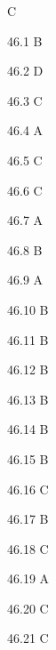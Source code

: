 \begin{Solution}{46}
C
\end{Solution}
\begin{Solution}{46.{1}}
B
\end{Solution}
\begin{Solution}{46.{2}}
D
\end{Solution}
\begin{Solution}{46.{3}}
C
\end{Solution}
\begin{Solution}{46.{4}}
A
\end{Solution}
\begin{Solution}{46.{5}}
C
\end{Solution}
\begin{Solution}{46.{6}}
C
\end{Solution}
\begin{Solution}{46.{7}}
A
\end{Solution}
\begin{Solution}{46.{8}}
B
\end{Solution}
\begin{Solution}{46.{9}}
A
\end{Solution}
\begin{Solution}{46.{10}}
B
\end{Solution}
\begin{Solution}{46.{11}}
B
\end{Solution}
\begin{Solution}{46.{12}}
B
\end{Solution}
\begin{Solution}{46.{13}}
B
\end{Solution}
\begin{Solution}{46.{14}}
B
\end{Solution}
\begin{Solution}{46.{15}}
B
\end{Solution}
\begin{Solution}{46.{16}}
C
\end{Solution}
\begin{Solution}{46.{17}}
B
\end{Solution}
\begin{Solution}{46.{18}}
C
\end{Solution}
\begin{Solution}{46.{19}}
A
\end{Solution}
\begin{Solution}{46.{20}}
C
\end{Solution}
\begin{Solution}{46.{21}}
C
\end{Solution}
